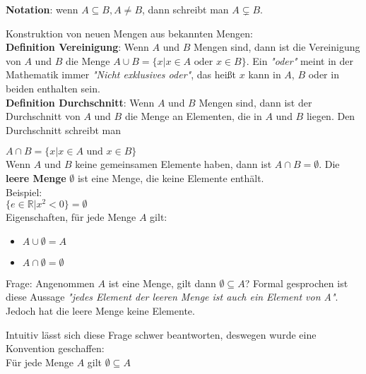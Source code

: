 \documentclass{article}
\begin{document}
\textbf{Notation}: wenn $A \subseteq B, A \ne B$, dann schreibt man $A \subsetneq B$.

Konstruktion von neuen Mengen aus bekannten Mengen: \\

\textbf{Definition Vereinigung}: Wenn $A$ und $B$ Mengen sind, dann ist die Vereinigung von $A$ und $B$ die
Menge $A \cup B = \{ x | x \in A \text{ oder } x \in B \}$. Ein \emph{"oder"} meint in der Mathematik immer
\emph{"Nicht exklusives oder"}, das heißt $x$ kann in $A$, $B$ oder in beiden enthalten sein. \\

\textbf{Definition Durchschnitt}: Wenn $A$ und $B$ Mengen sind, dann ist der Durchschnitt von $A$ und $B$ die
Menge an Elementen, die in $A$ und $B$ liegen. Den Durchschnitt schreibt man

$A \cap B = \{ x | x \in A \text{ und } x \in B\}$ \\

Wenn $A$ und $B$ keine gemeinsamen Elemente haben, dann ist $A \cap B = \emptyset$.
Die \textbf{leere Menge} $\emptyset$ ist eine Menge, die keine Elemente enthält. \\

Beispiel: \\
$\{e \in \mathbb{R} | x^2 < 0\} = \emptyset$ \\

Eigenschaften, für jede Menge $A$ gilt:
\begin{itemize}
\item $A \cup \emptyset = A$
\item $A \cap \emptyset = \emptyset$
\end{itemize}

Frage: Angenommen $A$ ist eine Menge, gilt dann $\emptyset \subseteq A$?
Formal gesprochen ist diese Aussage \emph{"jedes Element der leeren Menge ist auch ein Element von A"}.
Jedoch hat die leere Menge keine Elemente.

Intuitiv lässt sich diese Frage schwer beantworten, deswegen wurde eine Konvention geschaffen: \\

Für jede Menge $A$ gilt $\emptyset \subseteq A$
\end{document}
